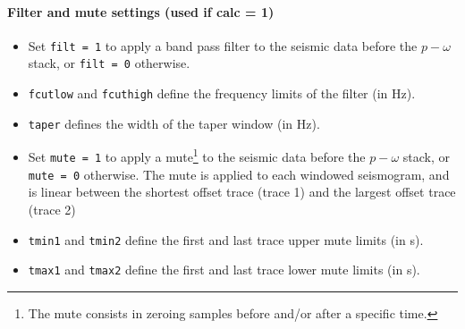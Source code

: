 \documentclass[twoside,a4paper]{article}
\begin{document}
\paragraph{Filter and mute settings (used if calc = 1)}
\begin{itemize}[leftmargin=*]
\setlength\itemsep{2ex}
\item Set \verb|filt = 1| to apply a band pass filter to the seismic data before the $p-\omega$ stack, or \verb|filt = 0| otherwise.

\item \verb|fcutlow| and \verb|fcuthigh| define the frequency limits of the filter (in Hz).

\item \verb|taper| defines the width of the taper window (in Hz).

\item Set \verb|mute = 1| to apply a mute\footnote{The mute consists in zeroing samples before and/or after a specific time.} to the seismic data before the $p-\omega$ stack, or \verb|mute = 0| otherwise. The mute is applied to each windowed seismogram, and is linear between the shortest offset trace (trace 1) and the largest offset trace (trace 2)

\item \verb|tmin1| and \verb|tmin2| define the first and last trace upper mute limits (in s).

\item \verb|tmax1| and \verb|tmax2| define the first and last trace lower mute limits (in s).
\end{itemize}
\end{document}
